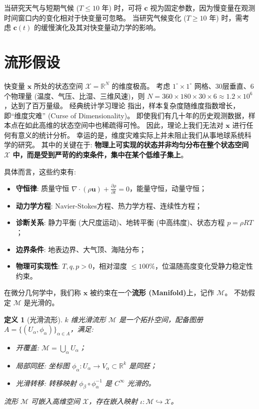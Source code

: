 \documentclass[12pt, a4paper]{article}
\newtheorem{definition}{定义}[section]
\newcommand{\R}{\mathbb{R}}
\newcommand{\manifold}{\mathcal{M}}
\newcommand{\dataspace}{\mathcal{X}}
\newcommand{\fastvar}{\bm{x}}          %
\newcommand{\slowvar}{\bm{c}}          %
\newcommand{\manifolddim}{k}            %
\newcommand{\coordmap}{\phi}            %
\begin{document}
当研究天气与短期气候 ($T \leq 10$ 年) 时，可将 $\slowvar$ 视为固定参数，因为慢变量在观测时间窗口内的变化相对于快变量可忽略。
当研究气候变化 ($T \geq 10$ 年) 时，需考虑 $\slowvar(t)$ 的缓慢演化及其对快变量动力学的影响。



\section{流形假设}

快变量 $\fastvar$ 所处的状态空间 $\dataspace = \R^N$ 的维度极高。
考虑 $1^\circ \times 1^\circ$ 网格、30层垂直、6个物理量 (温度、气压、比湿、三维风速)，则 $N = 360 \times 180 \times 30 \times 6 \approx 1.2 \times 10^6$，达到了百万量级。
经典统计学习理论 \cite{vapnik1999nature} 指出，样本复杂度随维度指数增长，即“维度灾难” (Curse of Dimensionality)。
即使我们有几十年的历史观测数据，样本点在如此高维的状态空间中也稀疏得可怜。
因此，理论上我们无法对 $\fastvar$ 进行任何有意义的统计分析。
幸运的是，维度灾难实际上并未阻止我们从事地球系统科学的研究。
其中的关键在于: \textbf{物理上可实现的状态并非均匀分布在整个状态空间 $\dataspace$ 中，而是受到严苛的约束条件，集中在某个低维子集上}。

具体而言，这些约束有:
\begin{itemize}
    \item \textbf{守恒律}: 质量守恒 $\nabla \cdot (\rho \bm{u}) + \frac{\partial \rho}{\partial t} = 0$，能量守恒，动量守恒；
    \item \textbf{动力学方程}: Navier-Stokes方程、热力学方程、连续性方程；
    \item \textbf{诊断关系}: 静力平衡 (大尺度运动)、地转平衡 (中高纬度)、状态方程 $p = \rho R T$；
    \item \textbf{边界条件}: 地表边界、大气顶、海陆分布；
    \item \textbf{物理可实现性}: $T, q, p > 0$，相对湿度 $\leq 100\%$，位温随高度变化受静力稳定性约束。
\end{itemize}

在微分几何学中，我们称 $\fastvar$ 被约束在一个\textbf{流形 (Manifold)}上，记作 $\manifold$。
不妨假定 $\manifold$ 是光滑的。

\begin{definition}[光滑流形]
\label{def:manifold}
    $\manifolddim$ 维光滑流形 $\manifold$ 是一个拓扑空间，配备图册 $A = \{(U_\alpha, \coordmap_\alpha)\}_{\alpha \in A}$，满足:
    \begin{itemize}
        \item 开覆盖: $\manifold = \bigcup_{\alpha} U_\alpha$；
        \item 局部同胚: 坐标图 $\coordmap_\alpha: U_\alpha \to V_\alpha \subset \R^{\manifolddim}$ 是同胚；
        \item 光滑转移: 转移映射 $\coordmap_\beta \circ \coordmap_\alpha^{-1}$ 是 $C^\infty$ 光滑的。
    \end{itemize}

    流形 $\manifold$ 可嵌入高维空间 $\dataspace$，存在嵌入映射 $\iota: \manifold \hookrightarrow \dataspace$。
\end{definition}
\end{document}
